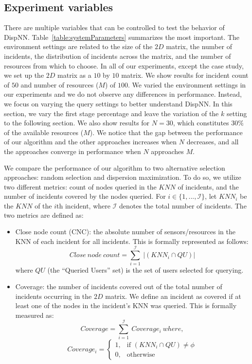 \documentclass{acm_proc_article-sp}
\begin{document}
\subsection{Experiment variables}
There are multiple variables that can be controlled to test the behavior of DispNN. Table~\ref{table:systemParameters} summarizes the most important.
The environment settings are related to the size of the $2D$ matrix, the number of incidents, the distribution of incidents across the matrix, and the number of resources from which to choose. In all of our experiments, except the case study, we set up the $2D$ matrix as a $10$ by $10$ matrix. We show results for incident count of $50$ and number of resources ($M$) of $100$.
We varied the environment settings in our experiments and we do not observe any differences in performance. Instead, we focus on varying the query settings to better understand DispNN. In this section, we vary the first stage percentage and leave the variation of the $k$ setting to the following section. We also show results for $N = 30$, which constitutes $30\%$ of the available resources ($M$). We notice that the gap between the performance of our algorithm and the other approaches increases when $N$ decreases, and all the approaches converge in performance when $N$ approaches $M$. \par

We compare the performance of our algorithm to two alternative selection approaches: random selection and dispersion maximization. To do so, we utilize two different metrics: count of nodes queried in the $KNN$ of incidents, and the number of incidents covered by the nodes queried. For $i \in \{1, ...,\mathcal{I}\}$, let $KNN_i$ be the $KNN$ of the $i$th incident, where $\mathcal{I}$ denotes the total number of incidents. The two metrics are defined as:
\begin{itemize}
\item Close node count (CNC): the absolute number of sensors/resources in the KNN of each incident for all incidents. This is formally represented as follows:
\begin{equation}
Close\ node\ count = \sum\limits_{ i = 1}^\mathcal{I}\ |(KNN_i \cap {QU})|
\end{equation}
where $QU$ (the ``Queried Users'' set) is the set of users selected for querying.
\item Coverage: the number of incidents covered out of the total number of incidents occurring in the $2D$ matrix. We define an incident as covered if at least one of the nodes in the incident's KNN was queried. This is formally measured as:
\begin{equation}
Coverage =  \sum\limits_{ i = 1}^\mathcal{I}\ Coverage_i\  where,
\end{equation}
\[
Coverage_i =
\begin{cases}
1,& \text{if }(KNN_i \cap {QU}) \neq \phi\\
0,              & \text{otherwise}
\end{cases}
\]
\end{itemize}
\end{document}
